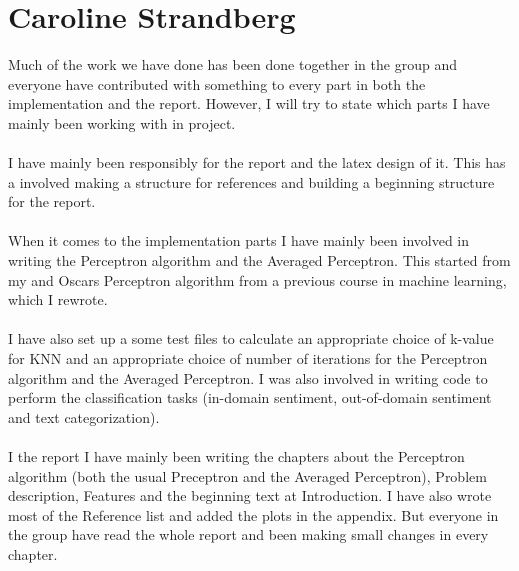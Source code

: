 \newpage
\section*{Caroline Strandberg}
Much of the work we have done has been done together in the group and everyone have contributed with something to every part in both the implementation and the report. However, I will try to state which parts I have mainly been working with in project. \\\\ 
I have mainly been responsibly for the report and the latex design of it. This has a involved making a structure for references and building a beginning structure for the report.   
\\\\
When it comes to the implementation parts I have mainly been involved in writing the Perceptron algorithm and the Averaged Perceptron. This started from my and Oscars Perceptron algorithm from a previous course in machine learning, which I rewrote. 
\\\\
I have also set up a some test files to calculate an appropriate choice of k-value for KNN and an appropriate choice of number of iterations for the Perceptron algorithm and the Averaged Perceptron. I was also involved in writing code to perform the classification tasks (in-domain sentiment, out-of-domain sentiment and text categorization).
\\\\
I the report I have mainly been writing the chapters about the Perceptron algorithm (both the usual Preceptron and the Averaged Perceptron), Problem description, Features and the beginning text at Introduction. I have also wrote most of the Reference list and added the plots in the appendix. But everyone in the group have read the whole report and been making small changes in every chapter. 
